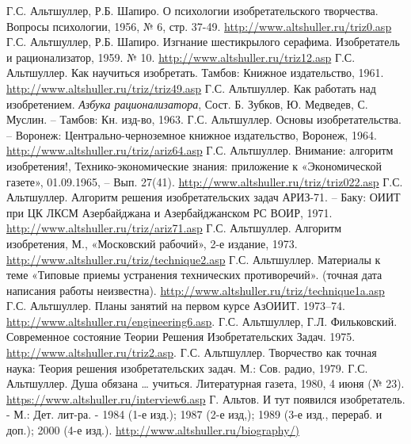 \begin{thebibliography}{xxx}
 Г.С. Альтшуллер, Р.Б. Шапиро. О психологии
  изобретательского творчества.  Вопросы психологии, 1956, № 6, стр. 37-49.
  \url{http://www.altshuller.ru/triz0.asp}
 Г.С. Альтшуллер, Р.Б. Шапиро. Изгнание шестикрылого
  серафима. Изобретатель и рационализатор, 1959. № 10.
  \url{http://www.altshuller.ru/triz12.asp}
 Г.С. Альтшуллер. Как научиться изобретать. Тамбов:
  Книжное издательство, 1961.  \url{http://www.altshuller.ru/triz/triz49.asp} 
 Г.С. Альтшуллер. Как работать над изобретением.
  \emph{Азбука рационализатора}, Сост. Б. Зубков, Ю. Медведев, С. Муслин. --
  Тамбов: Кн. изд-во, 1963.
 Г.С. Альтшуллер. Основы изобретательства. – Воронеж:
  Центрально-черноземное книжное издательство, Воронеж, 1964.
  \url{http://www.altshuller.ru/triz/ariz64.asp}
 Г.С. Альтшуллер. Внимание: алгоритм изобретения!,
  Технико-экономические знания: приложение к «Экономической газете»,
  01.09.1965, -- Вып. 27(41).  \url{http://www.altshuller.ru/triz/triz022.asp}
 Г.С. Альтшуллер.  Алгоритм решения изобретательских
  задач АРИЗ-71. – Баку: ОИИТ при ЦК ЛКСМ Азербайджана и Азербайджанском РС
  ВОИР, 1971. \url{http://www.altshuller.ru/triz/ariz71.asp}
 Г.С. Альтшуллер.  Алгоритм изобретения, М.,
  «Московский рабочий», 2-е издание, 1973.
  \url{http://www.altshuller.ru/triz/technique2.asp} 
 Г.С. Альтшуллер.  Материалы к теме «Типовые приемы
  устранения технических противоречий». (точная дата написания работы
  неизвестна).  \url{http://www.altshuller.ru/triz/technique1a.asp}
 Г.С. Альтшуллер. Планы занятий на первом курсе
  АзОИИТ.  1973--74. \url{http://www.altshuller.ru/engineering6.asp}.
 Г.С. Альтшуллер, Г.Л. Фильковский. Современное
  состояние Теории Решения Изобретательских Задач. 1975.
  \url{http://www.altshuller.ru/triz2.asp}.
 Г.С. Альтшуллер. Творчество как точная наука: Теория
  решения изобретательских задач. М.: Сов. радио, 1979.
 Г.С. Альтшуллер. Душа обязана …  учиться.
  Литературная газета, 1980, 4 июня (№ 23).
  \url{https://www.altshuller.ru/interview6.asp}
 Г. Альтов. И тут появился изобретатель.  - М.:
  Дет. лит-ра. - 1984 (1-е изд.); 1987 (2-е изд,); 1989 (3-е изд., перераб. и
  доп.); 2000 (4-е изд.).  \url{http://www.altshuller.ru/biography/)}

\end{thebibliography}
